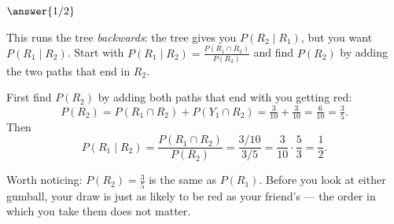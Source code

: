 \documentclass[12pt]{ximera}
\begin{document}
\begin{problem}
\begin{prompt}
$\answer{1/2}$

\begin{hint}
This runs the tree \emph{backwards}: the tree gives you $P(R_2\mid R_1)$, but you want
$P(R_1\mid R_2)$. Start with $P(R_1\mid R_2)=\frac{P(R_1\cap R_2)}{P(R_2)}$ and find
$P(R_2)$ by adding the two paths that end in $R_2$.
\end{hint}

\begin{feedback}
First find $P(R_2)$ by adding both paths that end with you getting red:
\[
P(R_2)=P(R_1\cap R_2)+P(Y_1\cap R_2)=\tfrac{3}{10}+\tfrac{3}{10}=\tfrac{6}{10}=\tfrac35.
\]
Then
\[
P(R_1\mid R_2)=\frac{P(R_1\cap R_2)}{P(R_2)}=\frac{3/10}{3/5}=\frac{3}{10}\cdot\frac53=\frac12.
\]

Worth noticing: $P(R_2)=\frac35$ is the same as $P(R_1)$. Before you look at either
gumball, your draw is just as likely to be red as your friend's --- the order in which
you take them does not matter.
\end{feedback}
\end{prompt}
\end{problem}
\end{document}
